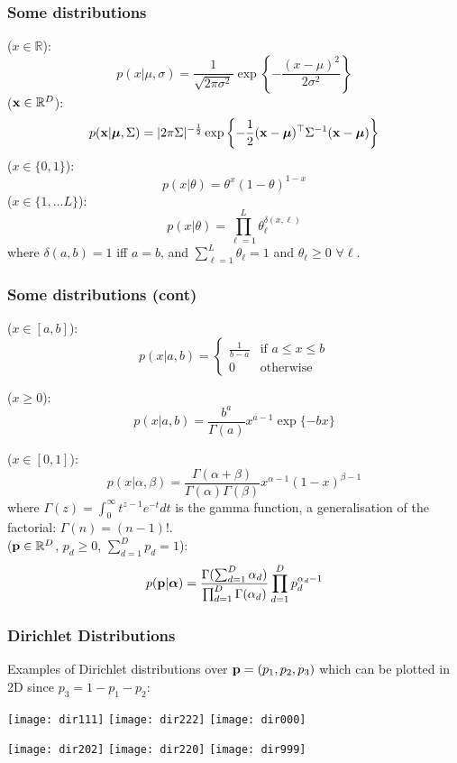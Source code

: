 \begin{frame}
\frametitle{Some distributions}

 ($x \in \mathbb{R}$):
\[
p(x|\mu,\sigma) = \frac{1}{\sqrt{2 \pi \sigma^2}} \exp \left\{
- \frac{(x - \mu)^2}{2 \sigma^2} \right\}
\]
 ($\mathbf x \in \mathbb{R}^D$):
\[
p(\mathbf x|{\boldsymbol{\mu}},\Sigma) = |2\pi \Sigma|^{-\frac{1}{2}} \exp \left\{
-\frac{1}{2} (\mathbf x - {\boldsymbol{\mu}}){\scriptsize^{\top}} \Sigma^{-1} 
(\mathbf x - {\boldsymbol{\mu}}) \right\}
\]
 ($x \in \{0, 1\}$):
\[
p(x|\theta) = \theta^x (1-\theta)^{1-x}
\]
 ($x \in \{1, \dots L\}$):
\[
p(x|\theta) = \prod_{\ell = 1}^L \theta_\ell^{\delta(x,\ell)} 
\]
where $\delta(a,b)=1 $ iff $a=b$, and $\sum_{\ell=1}^L \theta_\ell
=1$ and $\theta_\ell \ge 0 \, \, \forall \ell$.


\end{frame}
\begin{frame}
\frametitle{Some distributions (cont)}

 ($x \in [a,b]$):
\[
p(x|a,b) = \left\{ 
\begin{array}{cc} 
\frac{1}{b-a} & \mbox{if} \, \, a\le x \le b \\
0 & \mbox{otherwise}
\end{array}
\right.
\]

 ($x \ge 0$):
\[
p(x|a,b)= \frac{b^a}{\Gamma(a)} x^{a-1} \exp \{ - b x \} 
\]

 ($x \in [0,1]$):
\[
p(x|\alpha,\beta) =
\frac{\Gamma(\alpha+\beta)}{\Gamma(\alpha)\Gamma(\beta)} x^{\alpha-1}
(1-x)^{\beta-1} 
\]
where $\Gamma(z) = \int_0^\infty t^{z-1} e^{-t} dt$ is the gamma
function, a generalisation of the factorial: $\Gamma(n) = (n-1)!$. \\

 ($\mathbf{p} \in \mathbb{R}^D$, $p_d \ge 0$, $\sum_{d=1}^D p_d = 1$):
\[
p(\mathbf{p}|\boldsymbol{\alpha}) = \frac{\Gamma(\sum_{d=1}^D \alpha_d)}{\prod_{d=1}^D
\Gamma(\alpha_d)} \prod_{d=1}^D p_d^{\alpha_d -1}
\]

\end{frame}
\begin{frame}
\frametitle{Dirichlet Distributions}

\vspace*{-1ex}
Examples of Dirichlet distributions over $\mathbf{p}=(p_1, p_2, p_3)$ which
can be plotted in 2D since $p_3=1-p_1-p_2$:

\vspace{2ex}

\centerline{
\texttt{[image: dir111]}
\texttt{[image: dir222]}
\texttt{[image: dir000]}
}

\vspace{1ex}

\centerline{
\texttt{[image: dir202]}
\texttt{[image: dir220]}
\texttt{[image: dir999]}
}

\end{frame}
